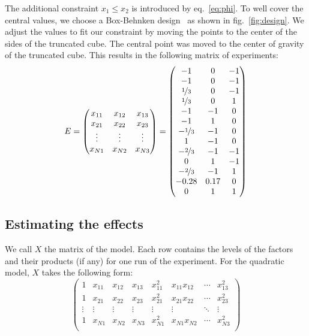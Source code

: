 The additional constraint $ x_1 \le x_2 $ is introduced by eq.~\ref{eq:phi}. To well cover the central values, we choose a Box-Behnken design~\cite{box_behnken} as shown in fig.~\ref{fig:design}. We adjust the values to fit our constraint by moving the points to the center of the sides of the truncated cube. The central point was moved to the center of gravity of the truncated cube. This results in the following matrix of experiments:
\begin{equation}
E = \begin{pmatrix}
		x_{11}  &  x_{12}  & x_{13} \\
		x_{21}  &  x_{22}  & x_{23} \\
		\vdots & \vdots & \vdots \\
		x_{N1} & x_{N2} & x_{N3}
		\end{pmatrix} = \begin{pmatrix}
		-1  &  0  & -1 \\
		-1  &  0  & -1 \\
		\nicefrac{1}{3} &	0	& -1 \\
		\nicefrac{1}{3} &	0	& 1  \\
		-1	&	-1	& 0 \\
		-1	&	1	& 0 \\
		-\nicefrac{1}{3} &	-1	& 0 \\
		1	  & -1  & 0 \\
		-\nicefrac{2}{3} &	-1	& -1 \\
		0	  &  1	& -1 \\
		-\nicefrac{2}{3} &	-1	& 1 \\
		-0.28 & 0.17 & 0 \\
		0 	& 1 	& 1 
		\end{pmatrix}
\end{equation}



\subsection{Estimating the effects}
We call $X$ the matrix of the model. Each row contains the levels of the factors and their products (if any) for one run of the experiment. For the quadratic model, $X$ takes the following form:
\begin{equation}
	\begin{pmatrix}
	1 & x_{11} & x_{12} & x_{13} & x_{11}^2 & x_{11} x_{12} & \cdots & x_{13}^2 \\
	1 & x_{21} & x_{22} & x_{23} & x_{21}^2 & x_{21} x_{22} & \cdots & x_{23}^2 \\
	 \vdots & \vdots & \vdots & \vdots & \vdots & \vdots & \ddots & \vdots\\
	1 & x_{N1} & x_{N2} & x_{N3} & x_{N1}^2 & x_{N1} x_{N2} & \cdots & x_{N3}^2 \\
	\end{pmatrix}
\end{equation}

